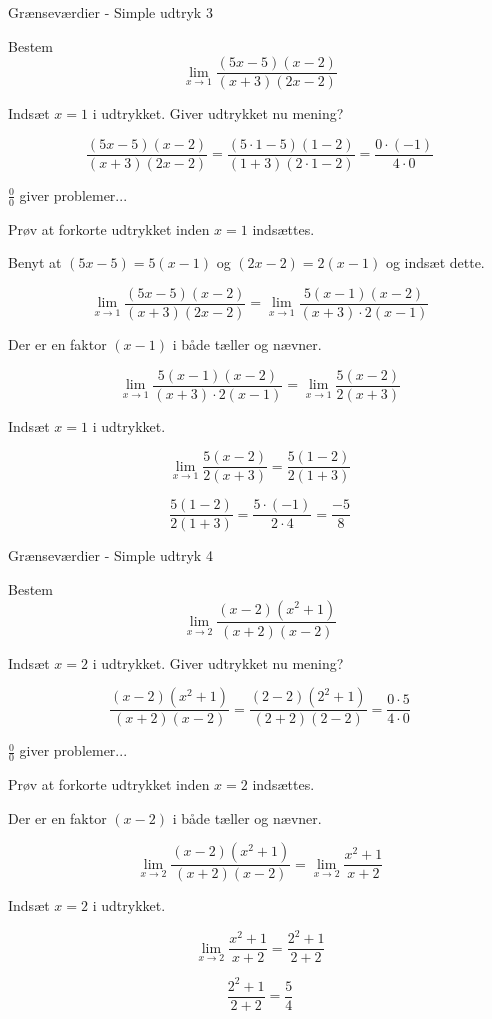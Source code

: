 \documentclass{article}
\begin{document}
\newpage
\begin{exercise}{Grænseværdier - Simple udtryk 3}
	
	Bestem 
	\[
	\lim_{x \to 1} \frac{(5x-5)(x-2)}{(x+3)(2x-2)}
	\]
	
	
	\hint
	Indsæt $x=1$ i udtrykket. Giver udtrykket nu mening?
	
	\hint
	\[
	\frac{(5x-5)(x-2)}{(x+3)(2x-2)} = \frac{(5\cdot 1-5)(1-2)}{(1+3)(2 \cdot 1-2)} = \frac{0 \cdot (-1)}{4 \cdot 0}
	\]
	
	\hint
	$\frac{0}{0}$ giver problemer...
	
	\hint
	Prøv at forkorte udtrykket inden $x=1$ indsættes.
	
	\hint
	Benyt at $(5x-5) = 5 (x-1)$ og $(2x-2) = 2(x-1)$ og indsæt dette.
	
	\hint
	\[
	\lim_{x \to 1} \frac{(5x-5)(x-2)}{(x+3)(2x-2)} = \lim_{x \to 1} \frac{5(x-1)(x-2)}{(x+3) \cdot 2(x-1)}
	\]
	
	
	\hint
	Der er en faktor $(x-1)$ i både tæller og nævner.
	
	\hint
	\[
	\lim_{x \to 1} \frac{5(x-1)(x-2)}{(x+3)\cdot 2(x-1)} = \lim_{x \to 1} \frac{5(x-2)}{2(x+3)}
	\]
	
	\hint
	Indsæt $x=1$ i udtrykket.
	
	\hint
	\[
	 \lim_{x \to 1} \frac{5(x-2)}{2(x+3)} = \frac{5(1-2)}{2(1+3)}
	\]
	
	\hint
	\[
	\frac{5(1-2)}{2(1+3)} = \frac{5 \cdot (-1)}{2 \cdot 4} = \frac{-5}{8}
	\]
	
	
\end{exercise}

\newpage
\begin{exercise}{Grænseværdier - Simple udtryk 4}
	
	Bestem 
	\[
	\lim_{x \to 2} \frac{(x-2)(x^2+1)}{(x+2)(x-2)}
	\]
	
	
	\hint
	Indsæt $x=2$ i udtrykket. Giver udtrykket nu mening?
	
	\hint
	\[
	\frac{(x-2)(x^2+1)}{(x+2)(x-2)} = \frac{(2-2)(2^2+1)}{(2+2)(2-2)} = \frac{0 \cdot 5}{4 \cdot 0}
	\]
	
	\hint
	$\frac{0}{0}$ giver problemer...
	
	\hint
	Prøv at forkorte udtrykket inden $x=2$ indsættes.
	
	\hint
	Der er en faktor $(x-2)$ i både tæller og nævner.
	
	\hint
	\[
	\lim_{x \to 2} \frac{(x-2)(x^2+1)}{(x+2)(x-2)} = \lim_{x \to 2} \frac{x^2+1}{x+2}
	\]
	
	
	\hint
	Indsæt $x=2$ i udtrykket.
	
	\hint
	\[
	\lim_{x \to 2} \frac{x^2+1}{x+2} =  \frac{2^2+1}{2+2}
	\]
	
	\hint
	\[
	\frac{2^2+1}{2+2} = \frac{5}{4}
	\]
	
	
\end{exercise}
\end{document}

